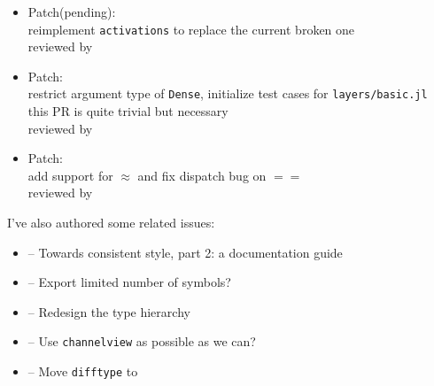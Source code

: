 \begin{itemize}
{      this PR serves as a first attempt to  -- Towards consistent style, part 2: a documentation guide\\
      not yet reviewed because the maintainers are busy lately
      }
    \item Patch(pending): \\
      {\small
      reimplement \texttt{activations} to replace the current broken one\\
      reviewed by \mikeinnes
      }
    \item Patch: \\
      {\small
      restrict argument type of \texttt{Dense}, initialize test cases for \texttt{layers/basic.jl}\\
      this PR is quite trivial but necessary\\
      reviewed by \mikeinnes
      }
    \item Patch: \\
      {\small
      add support for \textsf{$\approx$} and fix dispatch bug on \textsf{$==$} \\
      reviewed by \mikeinnes
      }
\end{itemize}
I've also authored some related issues:
\begin{itemize}
  \item {} -- Towards consistent style, part 2: a documentation guide
  \item {} -- Export limited number of symbols?
  \item {} -- Redesign the type hierarchy
  \item {} -- Use \texttt{channelview} as possible as we can?
  \item {} -- Move \texttt{difftype} to \imagecore
\end{itemize}

